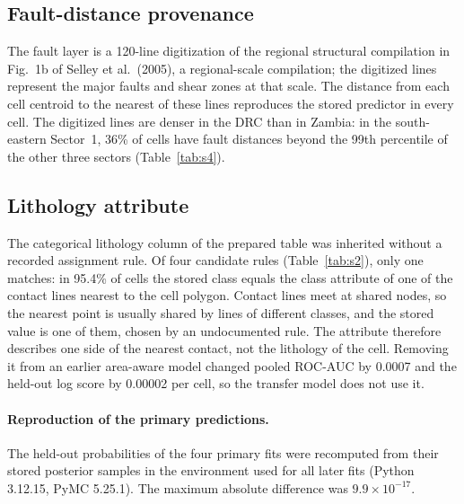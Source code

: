 \documentclass[11pt]{article}
\begin{document}
\subsection*{Fault-distance provenance}
\label{sec:s1-fault}

The fault layer is a 120-line digitization of the regional structural compilation in Fig.~1b of Selley et al.\ (2005), a regional-scale compilation; the digitized lines represent the major faults and shear zones at that scale. The distance from each cell centroid to the nearest of these lines reproduces the stored predictor in every cell. The digitized lines are denser in the DRC than in Zambia: in the south-eastern Sector~1, 36\% of cells have fault distances beyond the 99th percentile of the other three sectors (Table~\ref{tab:s4}).

\subsection*{Lithology attribute}
\label{sec:s1-lithology}

The categorical lithology column of the prepared table was inherited without a recorded assignment rule. Of four candidate rules (Table~\ref{tab:s2}), only one matches: in 95.4\% of cells the stored class equals the class attribute of one of the contact lines nearest to the cell polygon. Contact lines meet at shared nodes, so the nearest point is usually shared by lines of different classes, and the stored value is one of them, chosen by an undocumented rule. The attribute therefore describes one side of the nearest contact, not the lithology of the cell. Removing it from an earlier area-aware model changed pooled ROC-AUC by 0.0007 and the held-out log score by 0.00002 per cell, so the transfer model does not use it.

\begin{table}[ht]
\centering
\small
\caption{Agreement between the stored lithology attribute and four candidate assignment rules (1,899 cells; the majority rule is undefined for 10 cells with no valid raster pixel).}
\label{tab:s2}

\end{table}

\paragraph{Reproduction of the primary predictions.} The held-out probabilities of the four primary fits were recomputed from their stored posterior samples in the environment used for all later fits (Python 3.12.15, PyMC 5.25.1). The maximum absolute difference was $9.9\times10^{-17}$.
\end{document}
